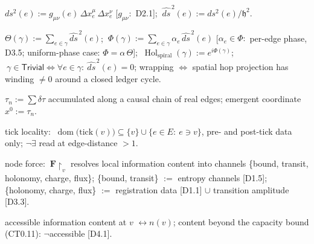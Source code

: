\begin{definition}[{\texorpdfstring{D1.6}{D1.6}}]\label{tag:D1-6}
$ds^2(e):=g_{\mu\nu}(e)\,\Delta x^\mu_e\,\Delta x^\nu_e$ [$g_{\mu\nu}:$ D2.1]; $\ \widehat{ds}^{\,2}(e):=ds^2(e)/\mathfrak h^2$.

\end{definition}

\begin{definition}[{\texorpdfstring{D1.7}{D1.7}}]\label{tag:D1-7}
$\Theta(\gamma):=\sum_{e\in\gamma}\widehat{ds}^{\,2}(e)$; $\ \Phi(\gamma):=\sum_{e\in\gamma}\alpha_e\,\widehat{ds}^{\,2}(e)$ [$\alpha_e\in\Phi:$ per-edge phase, D3.5; uniform-phase case: $\Phi=\alpha\,\Theta$]; $\ \operatorname{Hol}_{\mathrm{spiral}}(\gamma):=e^{i\Phi(\gamma)}$; $\ \gamma\in\mathsf{Trivial}\iff\forall e\in\gamma:\ \widehat{ds}^{\,2}(e)=0$; wrapping $\iff$ spatial hop projection has winding $\ne0$ around a closed ledger cycle.

\end{definition}

\begin{definition}[{\texorpdfstring{D1.8}{D1.8}}]\label{tag:D1-8}
$\tau_n:=\sum\delta\tau$ accumulated along a causal chain of real edges; emergent coordinate $x^0:=\tau_n$.

\end{definition}

\begin{definition}[{\texorpdfstring{D1.9}{D1.9}}]\label{tag:D1-9}
tick locality: $\ \operatorname{dom}\bigl(\mathrm{tick}(v)\bigr)\subseteq\{v\}\cup\{e\in E:\ e\ni v\}$, pre- and post-tick data only; $\neg\exists$ read at edge-distance $>1$.

\end{definition}

\begin{definition}[{\texorpdfstring{D1.10}{D1.10}}]\label{tag:D1-10}
node force: $\ \mathbf F\!\restriction_v$ resolves local information content into channels \{bound, transit, holonomy, charge, flux\}; \{bound, transit\} $:=$ entropy channels [D1.5]; \{holonomy, charge, flux\} $:=$ registration data [D1.1] $\cup$ transition amplitude [D3.3].

\end{definition}

\begin{definition}[{\texorpdfstring{D1.11}{D1.11}}]\label{tag:D1-11}
accessible information content at $v$ $\leftrightarrow n(v)$; content beyond the capacity bound (CT0.11): $\neg$accessible [D4.1].

\end{definition}

